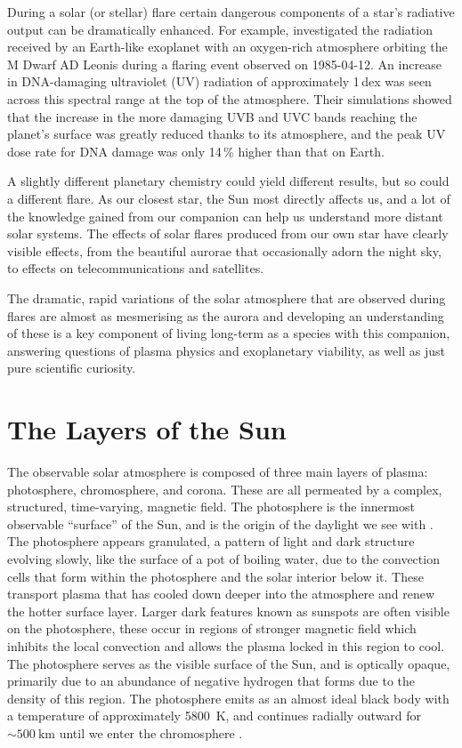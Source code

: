 During a solar (or stellar) flare certain dangerous components of a star's radiative output can be dramatically enhanced.
For example, \citet{Segura2010} investigated the radiation received by an Earth-like exoplanet with an oxygen-rich atmosphere orbiting the M Dwarf AD Leonis during a flaring event observed on 1985-04-12.
An increase in DNA-damaging ultraviolet (UV) radiation of approximately 1\,dex was seen across this spectral range at the top of the atmosphere.
Their simulations showed that the increase in the more damaging UVB and UVC bands reaching the planet's surface was greatly reduced thanks to its atmosphere, and the peak UV dose rate for DNA damage was only 14\,\% higher than that on Earth.

A slightly different planetary chemistry could yield different results, but so could a different flare.
As our closest star, the Sun most directly affects us, and a lot of the knowledge gained from our companion can help us understand more distant solar systems.
The effects of solar flares produced from our own star have clearly visible effects, from the beautiful aurorae that occasionally adorn the night sky, to effects on telecommunications and satellites.

The dramatic, rapid variations of the solar atmosphere that are observed during flares are almost as mesmerising as the aurora and developing an understanding of these is a key component of living long-term as a species with this companion, answering questions of plasma physics and exoplanetary viability, as well as just pure scientific curiosity.

\section{The Layers of the Sun}

The observable solar atmosphere is composed of three main layers of plasma: photosphere, chromosphere, and corona.
These are all permeated by a complex, structured, time-varying, magnetic field.
The photosphere is the innermost observable ``surface'' of the Sun, and is the origin of the daylight we see with \citep{Zirin1992}.
The photosphere appears granulated, a pattern of light and dark structure evolving slowly, like the surface of a pot of boiling water, due to the convection cells that form within the photosphere and the solar interior below it.
These transport plasma that has cooled down deeper into the atmosphere and renew the hotter surface layer.
Larger dark features known as sunspots are often visible on the photosphere, these occur in regions of stronger magnetic field which inhibits the local convection and allows the plasma locked in this region to cool.
The photosphere serves as the visible surface of the Sun, and is optically opaque, primarily due to an abundance of negative hydrogen that forms due to the density of this region.
The photosphere emits as an almost ideal black body with a temperature of approximately \SI{5800}{\kelvin}, and continues radially outward for $\sim\SI{500}{\kilo\metre}$ until we enter the chromosphere \citep{Carroll2007}.

